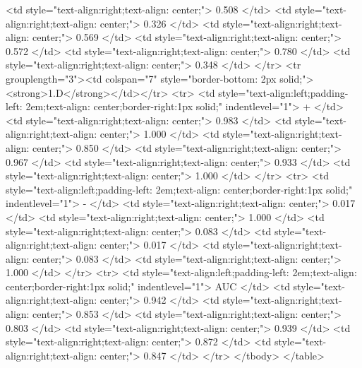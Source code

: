    <td style="text-align:right;text-align: center;"> 0.508 </td>
   <td style="text-align:right;text-align: center;"> 0.326 </td>
   <td style="text-align:right;text-align: center;"> 0.569 </td>
   <td style="text-align:right;text-align: center;"> 0.572 </td>
   <td style="text-align:right;text-align: center;"> 0.780 </td>
   <td style="text-align:right;text-align: center;"> 0.348 </td>
  </tr>
  <tr grouplength="3"><td colspan="7" style="border-bottom: 2px solid;"><strong>1.D</strong></td></tr>
<tr>
   <td style="text-align:left;padding-left: 2em;text-align: center;border-right:1px solid;" indentlevel="1"> + </td>
   <td style="text-align:right;text-align: center;"> 0.983 </td>
   <td style="text-align:right;text-align: center;"> 1.000 </td>
   <td style="text-align:right;text-align: center;"> 0.850 </td>
   <td style="text-align:right;text-align: center;"> 0.967 </td>
   <td style="text-align:right;text-align: center;"> 0.933 </td>
   <td style="text-align:right;text-align: center;"> 1.000 </td>
  </tr>
  <tr>
   <td style="text-align:left;padding-left: 2em;text-align: center;border-right:1px solid;" indentlevel="1"> - </td>
   <td style="text-align:right;text-align: center;"> 0.017 </td>
   <td style="text-align:right;text-align: center;"> 1.000 </td>
   <td style="text-align:right;text-align: center;"> 0.083 </td>
   <td style="text-align:right;text-align: center;"> 0.017 </td>
   <td style="text-align:right;text-align: center;"> 0.083 </td>
   <td style="text-align:right;text-align: center;"> 1.000 </td>
  </tr>
  <tr>
   <td style="text-align:left;padding-left: 2em;text-align: center;border-right:1px solid;" indentlevel="1"> AUC </td>
   <td style="text-align:right;text-align: center;"> 0.942 </td>
   <td style="text-align:right;text-align: center;"> 0.853 </td>
   <td style="text-align:right;text-align: center;"> 0.803 </td>
   <td style="text-align:right;text-align: center;"> 0.939 </td>
   <td style="text-align:right;text-align: center;"> 0.872 </td>
   <td style="text-align:right;text-align: center;"> 0.847 </td>
  </tr>
</tbody>
</table>
